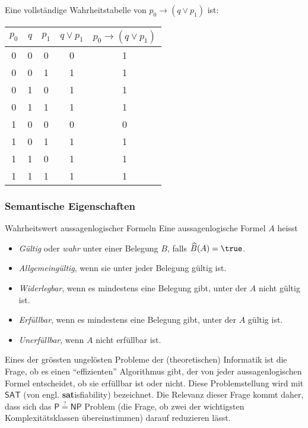 \begin{example}
    Eine vollständige Wahrheitstabelle von $p_0\to (q\lor p_1)$ ist:
    \begin{center}
        \begin{tabular} {| c | c | c || c | c |}
            \hline
            $p_0$ & $q$ & $p_1$ & $q\lor p_1$ & $p_0\to (q\lor p_1)$ \\ \hline
            0 & 0 & 0 & 0 & 1 \\
            0 & 0 & 1 & 1 & 1\\
            0 & 1 & 0 & 1 & 1\\
            0 & 1 & 1 & 1& 1\\
            1 & 0 & 0 & 0 & 0\\
            1 & 0 & 1 & 1 & 1\\
            1 & 1 & 0 & 1 & 1\\
            1 & 1 & 1 & 1 & 1\\ \hline
        \end{tabular}
    \end{center}
\end{example}

\subsubsection{Semantische Eigenschaften}

\begin{definition}{Wahrheitswert aussagenlogischer Formeln}
    Eine aussagenlogische Formel $A$ heisst
    \begin{itemize}
        \item \textit{Gültig} oder \textit{wahr} unter einer Belegung $B$, falls $\widehat{B}(A)=\true$.
        \item \textit{Allgemeingültig}, wenn sie unter jeder Belegung gültig ist.
        \item \textit{Widerlegbar}, wenn es mindestens eine Belegung gibt, unter der $A$ nicht gültig ist.
        \item \textit{Erfüllbar}, wenn es mindestens eine Belegung gibt, unter der $A$ gültig ist.
        \item \textit{Unerfüllbar}, wenn $A$ nicht erfüllbar ist.
    \end{itemize}
\end{definition}

\begin{remark}
    Eines der grössten ungelösten Probleme der (theoretischen) Informatik ist die Frage,
    ob es einen ``effizienten'' Algorithmus gibt, der von jeder aussagenlogischen Formel
    entscheidet, ob sie erfüllbar ist oder nicht. Diese Problemstellung wird mit $\mathsf{SAT}$ (von
    engl. \textbf{sat}isfiability) bezeichnet. Die Relevanz dieser Frage kommt daher, dass sich das
    $\mathsf{P}\stackrel{?}{=}\mathsf{NP}$ Problem (die Frage, ob zwei der wichtigsten Komplexitätsklassen übereinstimmen) darauf reduzieren lässt.
\end{remark}

